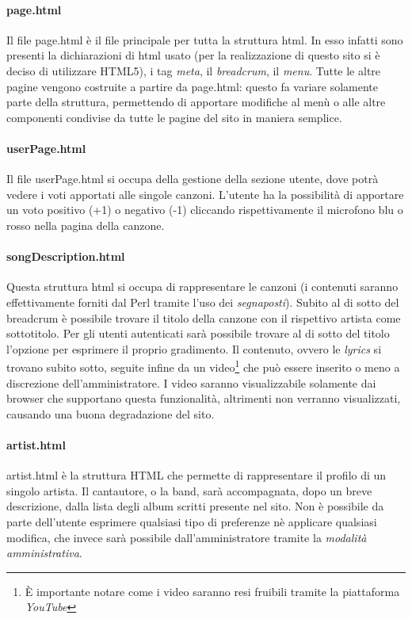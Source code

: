 \paragraph*{page.html} Il file page.html \`e il file principale per tutta la struttura html. In esso infatti sono presenti la dichiarazioni di html usato (per la realizzazione di questo sito si \`e deciso di utilizzare HTML5), i tag \textit{meta}, il \textit{breadcrum}, il \textit{menu}. Tutte le altre pagine vengono costruite a partire da page.html: questo fa variare solamente parte della struttura, permettendo di apportare modifiche al men\`u o alle altre componenti condivise da tutte le pagine del sito in maniera semplice.

\paragraph*{userPage.html} Il file userPage.html si occupa della gestione della sezione utente, dove potrà vedere i voti apportati alle singole canzoni. L'utente ha la possibilità di apportare un voto positivo (+1) o negativo (-1) cliccando rispettivamente il microfono blu o rosso nella pagina della canzone.

\paragraph*{songDescription.html} Questa struttura html si occupa di rappresentare le canzoni (i contenuti saranno effettivamente forniti dal Perl tramite l'uso dei \textit{segnaposti}). Subito al di sotto del breadcrum è possibile trovare il titolo della canzone con il rispettivo artista come sottotitolo. Per gli utenti autenticati sarà possibile trovare al di sotto del titolo l'opzione per esprimere il proprio gradimento. Il contenuto, ovvero le \textit{lyrics} si trovano subito sotto, seguite infine da un video\footnote{È importante notare come i video saranno resi fruibili tramite la piattaforma \textit{YouTube}} che può essere inserito o meno a discrezione dell'amministratore. I video saranno visualizzabile solamente dai browser che supportano questa funzionalità, altrimenti non verranno visualizzati, causando una buona degradazione del sito.

\paragraph*{artist.html} artist.html è la struttura HTML che permette di rappresentare il profilo di un singolo artista. Il cantautore, o la band, sarà accompagnata, dopo un breve descrizione, dalla lista degli album scritti presente nel sito. Non è possibile da parte dell'utente esprimere qualsiasi tipo di preferenze nè applicare qualsiasi modifica, che invece sarà possibile dall'amministratore tramite la \textit{modalità amministrativa}.

